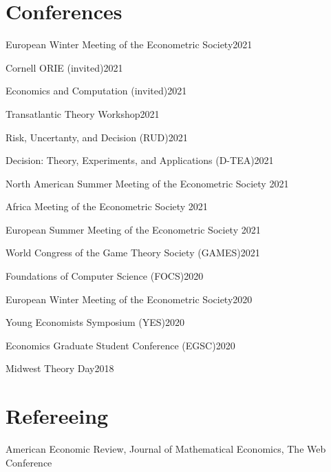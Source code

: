 \documentclass[margin,line]{res}
\newenvironment{list1}{
  \begin{list}{\ding{113}}{%
      \setlength{\itemsep}{.025in}
      \setlength{\parsep}{0in} \setlength{\parskip}{0in}
      \setlength{\topsep}{0in} \setlength{\partopsep}{0in}
      \setlength{\leftmargin}{0.17in}}}{\end{list}}
\begin{document}
\begin{resume}
\section{ Conferences}
\begin{list1}
\item[] European Winter Meeting of the Econometric Society\hfill 2021
\item[] Cornell ORIE (invited)\hfill 2021
\item[] Economics and Computation (invited)\hfill 2021
\item[] Transatlantic Theory Workshop\hfill 2021
\item[] Risk, Uncertanty, and Decision (RUD)\hfill 2021
\item[] Decision: Theory, Experiments, and Applications (D-TEA)\hfill 2021
\item[] North American Summer Meeting of the Econometric Society \hfill 2021
\item[] Africa Meeting of the Econometric Society \hfill 2021
\item[] European Summer Meeting of the Econometric Society \hfill 2021
\item[] World Congress of the Game Theory Society (GAMES)\hfill 2021
\item[] Foundations of Computer Science (FOCS)\hfill 2020
\item[] European Winter Meeting of the Econometric Society\hfill 2020
\item[] Young Economists Symposium (YES)\hfill 2020
\item[] Economics Graduate Student Conference (EGSC)\hfill 2020
\item[] Midwest Theory Day\hfill 2018
\end{list1}

\section{Refereeing}
\begin{list1}
\item[] American Economic Review, Journal of Mathematical Economics, The Web Conference
\end{list1}


\end{resume}
\end{document}
